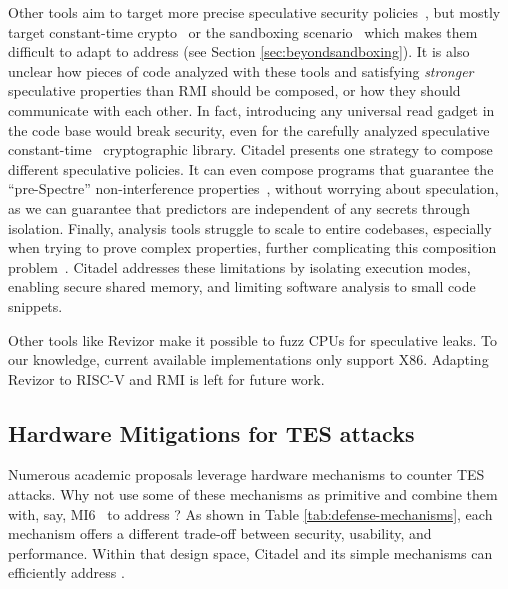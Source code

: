 Other tools aim to target more precise speculative security policies~\cite{guarnieri2021hardware,cauligi2022sok}, but mostly target constant-time crypto~\cite{barthe2021high, cauligi2020constant, daniel2021hunting, guanciale2020inspectre, guarnieri2020spectector, patrignani2021exorcising, vassena2021automatically} or the sandboxing scenario~\cite{cheang2019formal, narayan2021swivel, qi2021spectaint, shen2018restricting, jenkins2020ghostbusting, oleksenko2020specfuzz, kirzner2021analysis} which makes them difficult to adapt to address \prob{} (see Section \ref{sec:beyondsandboxing}).
It is also unclear how pieces of code analyzed with these tools and satisfying \emph{stronger} speculative properties than RMI should be composed, or how they should communicate with each other.
In fact, introducing any universal read gadget in the code base would break security, even for the carefully analyzed speculative constant-time~\cite{cauligi2020constant} cryptographic library.
Citadel presents one strategy to compose different speculative policies.
It can even compose programs that guarantee the ``pre-Spectre'' non-interference properties~\cite{barthe2014system}, without worrying about speculation, as we can guarantee that predictors are independent of any secrets through isolation.
Finally, analysis tools struggle to scale to entire codebases, especially when trying to prove complex properties, further complicating this composition problem~\cite{guarnieri2020spectector,wang2019oo7,johannesmeyer2022kasper,wang2020kleespectre}.
Citadel addresses these limitations by isolating execution modes, enabling secure shared memory, and limiting software analysis to small code snippets.

Other tools like Revizor \cite{oleksenko2022revizor, garcia2023fuzzing} make it possible to fuzz CPUs for speculative leaks. 
To our knowledge, current available implementations only support X86. 
Adapting Revizor to RISC-V and RMI is left for future work.

\subsection{Hardware Mitigations for TES attacks}
\label{sec:exisitngTEAmech}
Numerous academic proposals \cite{ainsworth2020muontrap, cheang2019formal, canella2019systematic, barber2019specshield, fustos2019spectreguard, yan2018invisispec, yu2019speculative, saileshwar2019cleanupspec, weisse2019nda, khasawneh2019safespec, guarnieri2020spectector, guarnieri2021hardware, mosier2022axiomatic,ainsworth2021ghostminion, daniel2023prospect, choudhary2021speculative, kiriansky2018dawg, sakalis2019efficient, li2019conditional, narayan2023going} leverage hardware mechanisms to counter TES attacks.
Why not use some of these mechanisms as primitive and combine them with, say, MI6~\cite{bourgeat2019mi6} to address \prob{}?
As shown in Table \ref{tab:defense-mechanisms}, each mechanism offers a different trade-off between security, usability, and performance.
Within that design space, Citadel and its simple mechanisms can efficiently address \prob{}.

